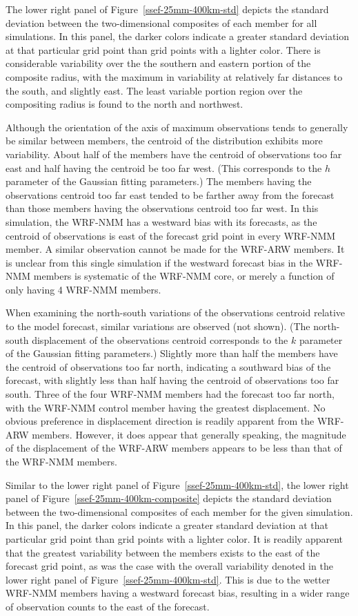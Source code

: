 The lower right panel of \mbox{Figure \ref{ssef-25mm-400km-std}} depicts the standard deviation between the two-dimensional composites of each member for all simulations.
In this panel, the darker colors indicate a greater standard deviation at that particular grid point than grid points with a lighter color.
There is considerable variability over the the southern and eastern portion of the composite radius, with the maximum in variability at relatively far distances to the south, and slightly east.
The least variable portion region over the compositing radius is found to the north and northwest.


Although the orientation of the axis of maximum observations tends to generally be similar between members, the centroid of the distribution exhibits more variability.
About half of the members have the centroid of observations too far east and half having the centroid be too far west.
(This corresponds to the $h$ parameter of the Gaussian fitting parameters.)
The members having the observations centroid too far east tended to be farther away from the forecast than those members having the observations centroid too far west.
In this simulation, the WRF-NMM has a westward bias with its forecasts, as the centroid of observations is east of the forecast grid point in every WRF-NMM member.
A similar observation cannot be made for the WRF-ARW members.
It is unclear from this single simulation if the westward forecast bias in the WRF-NMM members is systematic of the WRF-NMM core, or merely a function of only having 4 WRF-NMM members.


When examining the north-south variations of the observations centroid relative to the model forecast, similar variations are observed (not shown).
(The north-south displacement of the observations centroid corresponds to the $k$ parameter of the Gaussian fitting parameters.)
Slightly more than half the members have the centroid of observations too far north, indicating a southward bias of the forecast, with slightly less than half having the centroid of observations too far south.
Three of the four WRF-NMM members had the forecast too far north, with the WRF-NMM control member having the greatest displacement.
No obvious preference in displacement direction is readily apparent from the WRF-ARW members.
However, it does appear that generally speaking, the magnitude of the displacement of the WRF-ARW members appears to be less than that of the WRF-NMM members.


Similar to the lower right panel of \mbox{Figure \ref{ssef-25mm-400km-std}}, the lower right panel of \mbox{Figure \ref{ssef-25mm-400km-composite}} depicts the standard deviation between the two-dimensional composites of each member for the given simulation.
In this panel, the darker colors indicate a greater standard deviation at that particular grid point than grid points with a lighter color.
It is readily apparent that the greatest variability between the members exists to the east of the forecast grid point, as was the case with the overall variability denoted in the lower right panel of \mbox{Figure \ref{ssef-25mm-400km-std}}.
This is due to the wetter WRF-NMM members having a westward forecast bias, resulting in a wider range of observation counts to the east of the forecast.


